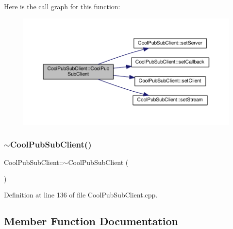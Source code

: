 Here is the call graph for this function\+:\nopagebreak
\begin{figure}[H]
\begin{center}
\leavevmode
\includegraphics[width=350pt]{class_cool_pub_sub_client_a6466f55abe5820d410b1c9cf7a70ec7e_cgraph}
\end{center}
\end{figure}
\mbox{\label{class_cool_pub_sub_client_aa9404bea508c0755d3d3ea29e921d60f}} 
\subsubsection{\texorpdfstring{$\sim$\+Cool\+Pub\+Sub\+Client()}{~CoolPubSubClient()}}
{\footnotesize\ttfamily Cool\+Pub\+Sub\+Client\+::$\sim$\+Cool\+Pub\+Sub\+Client (\begin{DoxyParamCaption}{ }\end{DoxyParamCaption})}



Definition at line 136 of file Cool\+Pub\+Sub\+Client.\+cpp.



\subsection{Member Function Documentation}
\mbox{\label{class_cool_pub_sub_client_a2664c2ebc302b2fa49f493a339ecc891}} 
